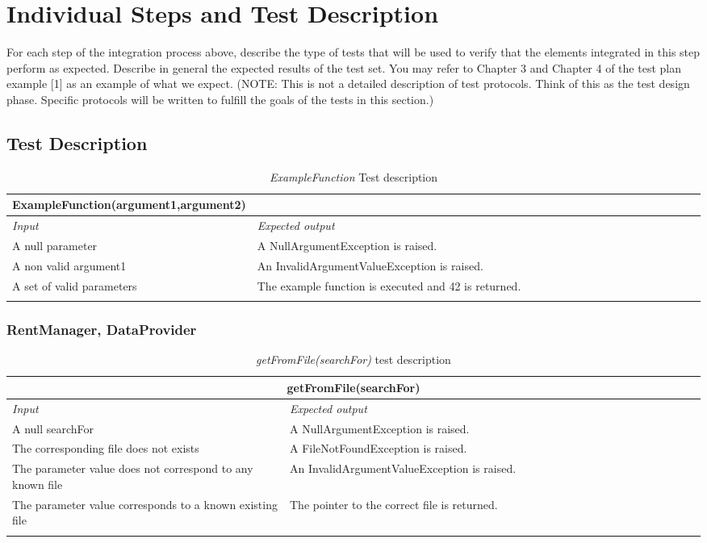 \section{Individual Steps and Test Description}

For each step of the integration process above, describe the type of tests that will be used to verify that the elements integrated in this step perform as expected. Describe in general the expected results of the test set. You may refer to Chapter 3 and Chapter 4 of the test plan example [1] as an example of what we expect.
(NOTE: This is not a detailed description of test protocols. Think of this as the test design phase. Specific protocols will be written to fulfill the goals of the tests in this section.)

\subsection{Test Description}

\begin{longtable}{p{0.3\linewidth}p{0.7\linewidth}}
\hline \textbf{ExampleFunction(argument1,argument2)} \\
\toprule
\emph{Input} & \emph{Expected output} \\
\midrule
A null parameter & A NullArgumentException is raised.\\
\midrule
A non valid argument1 & An InvalidArgumentValueException is
raised. \\
\midrule
A set of valid parameters & The example function is executed and 42 is returned. \\
\bottomrule
\caption{\emph{ExampleFunction} Test description}
\end{longtable}

\subsubsection{RentManager, DataProvider}

\begin{longtable}{p{0.4\linewidth}p{0.6\linewidth}}
\multicolumn{2}{c}{\textbf{getFromFile(searchFor)}} \\
\toprule
\emph{Input} & \emph{Expected output} \\
\midrule
A null searchFor & A NullArgumentException is raised.\\
\midrule
The corresponding file does not exists & A FileNotFoundException is raised. \\
\midrule
The parameter value does not correspond to any known file & An InvalidArgumentValueException is raised. \\
\midrule
The parameter value corresponds to a known existing file & The pointer to the correct file is returned. \\
\bottomrule
\caption{\emph{getFromFile(searchFor)} test description}
\end{longtable}


